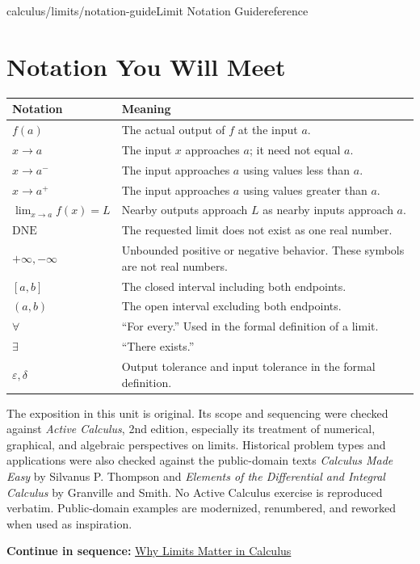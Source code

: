 \documentclass[11pt,openany]{book}
\theoremstyle{bgplain}
\newcommand{\webnext}[2]{%
  \par\addvspace{1.2em}\noindent{\color{BGLine}\rule{\textwidth}{0.35pt}}\par\smallskip
  {\small\color{BGGray}\textbf{Continue in sequence:} \hyperlink{web:#1}{#2}}\par
}
\newcommand{\DNE}{\mathrm{DNE}}
\newcommand{\eps}{\varepsilon}
\begin{document}
\begin{webpage}{calculus/limits/notation-guide}{Limit Notation Guide}{reference}
\chapter*{Notation You Will Meet}

\begin{longtable}{@{}p{}p{}@{}}
\toprule
\textbf{Notation} & \textbf{Meaning}\\
\midrule
\endhead
\(f(a)\) & The actual output of \(f\) at the input \(a\).\\
\(x\to a\) & The input \(x\) approaches \(a\); it need not equal \(a\).\\
\(x\to a^-\) & The input approaches \(a\) using values less than \(a\).\\
\(x\to a^+\) & The input approaches \(a\) using values greater than \(a\).\\
\(\displaystyle\lim_{x\to a}f(x)=L\) & Nearby outputs approach \(L\) as nearby inputs approach \(a\).\\
\(\DNE\) & The requested limit does not exist as one real number.\\
\(+\infty,-\infty\) & Unbounded positive or negative behavior. These symbols are not real numbers.\\
\([a,b]\) & The closed interval including both endpoints.\\
\((a,b)\) & The open interval excluding both endpoints.\\
\(\forall\) & ``For every.'' Used in the formal definition of a limit.\\
\(\exists\) & ``There exists.''\\
\(\eps,\delta\) & Output tolerance and input tolerance in the formal definition.\\
\bottomrule
\end{longtable}

\begin{bgsource}
The exposition in this unit is original. Its scope and sequencing were checked against \emph{Active Calculus}, 2nd edition, especially its treatment of numerical, graphical, and algebraic perspectives on limits. Historical problem types and applications were also checked against the public-domain texts \emph{Calculus Made Easy} by Silvanus P. Thompson and \emph{Elements of the Differential and Integral Calculus} by Granville and Smith. No Active Calculus exercise is reproduced verbatim. Public-domain examples are modernized, renumbered, and reworked when used as inspiration.
\end{bgsource}
\webnext{calculus/limits/why-limits-matter}{Why Limits Matter in Calculus}
\end{webpage}
\end{document}
